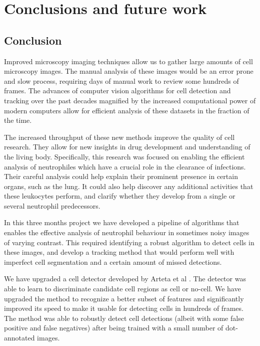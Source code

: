 		
\chapter{Conclusions and future work\statusfirstdraft}
\label{chap:conclusion}


\section{Conclusion \statusfirstdraft}
\label{sec:conclusion_conclusion}

Improved microscopy imaging techniques allow us to gather large amounts of cell microscopy images. The manual analysis of these images would be an error prone and slow process, requiring days of manual work to review some hundreds of frames. The advances of computer vision algorithms for cell detection and tracking over the past decades magnified by the increased computational power of modern computers allow for efficient analysis of these datasets in the fraction of the time.

The increased throughput of these new methods improve the quality of cell research. They allow for new insights in drug development and understanding of the living body. Specifically, this research was focused on enabling the efficient analysis of neutrophiles which have a crucial role in the clearance of infections. Their careful analysis could help explain their prominent presence in certain organs, such as the lung. It could also help discover any additional activities that these leukocytes perform, and clarify whether they develop from a single or several neutrophil predecessors.

In this three months project we have developed a pipeline of algorithms that enables the effective analysis of neutrophil behaviour in sometimes noisy images of varying contrast. This required identifying a robust algorithm to detect cells in these images, and develop a tracking method that would perform well with imperfect cell segmentation and a certain amount of missed detections.

We have upgraded a cell detector developed by Arteta et al \cite{arteta12}. The detector was able to learn to discriminate candidate cell regions as cell or no-cell. We have upgraded the method to recognize a better subset of features and significantly improved its speed to make it usable for detecting cells in hundreds of frames. The method was able to robustly detect cell detections (albeit with some false positive and false negatives) after being trained with a small number of dot-annotated images.

